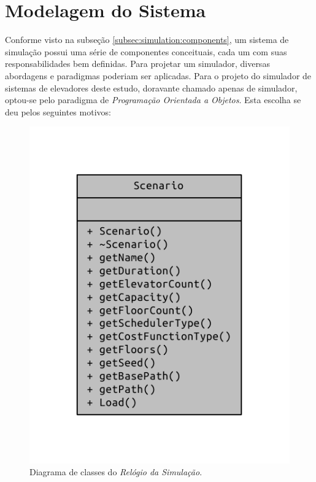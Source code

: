 \chapter{\label{chap:modeling}Modelagem do Sistema}

Conforme visto na subseção \ref{subsec:simulation:components}, um sistema de
simulação possui uma série de componentes conceituais, cada um com suas
responsabilidades bem definidas. Para projetar um simulador, diversas abordagens
e paradigmas poderiam ser aplicadas. Para o projeto do simulador de sistemas de
elevadores deste estudo, doravante chamado apenas de simulador, optou-se pelo
paradigma de \textit{Programação Orientada a Objetos}. Esta escolha se deu pelos
seguintes motivos:

\begin{figure}[htb!]
  \centering
  \includegraphics{doc/latex/class_scenario__coll__graph}
  \caption{Diagrama de classes do \textit{Relógio da Simulação}.}
\label{fig:TEST}
\end{figure}


